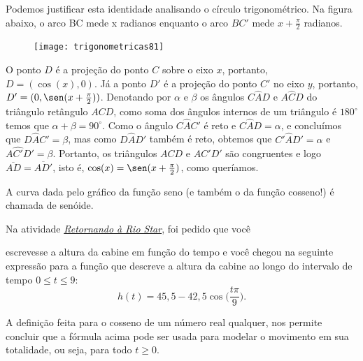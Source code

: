 Podemos justificar esta identidade analisando o círculo trigonométrico. Na figura abaixo, o arco BC mede x radianos enquanto o arco $BC'$ mede $x + \frac{\pi}{2}$ radianos. 

\begin{figure}[H]
\centering

\texttt{[image: trigonometricas81]}
\end{figure}

O ponto $D$ é a projeção do ponto $C$ sobre o eixo $x$, portanto, $D = (\cos(x), 0)$. Já a ponto $D'$ é a projeção do ponto $C'$ no eixo $y$, portanto, $D' = (0,\sen(x +  \frac{\pi}{2}))$. Denotando por $\alpha$ e $\beta$ os ângulos $C\hat{A}D$ e $A\hat{C}D$ do triângulo retângulo $ACD$, como soma dos ângulos internos de um triângulo é $180^{\circ}$ temos que $\alpha+\beta=90^{\circ}$. Como o ângulo $C\hat{A}C'$ é reto e $C\hat{A}D=\alpha$, e concluímos que $D\hat{A}C'=\beta$, mas como $D\hat{A}D'$ também é reto, obtemos que $C'\hat{A}D'=\alpha$ e $A\hat{C'}D'=\beta$. Portanto, os triângulos $ACD$ e $AC'D'$ são congruentes e logo $\overline{AD}=\overline{AD'}$, isto é, $\cos(x) = \sen(x +  \frac{\pi}{2})$, como queríamos.


A curva dada pelo gráfico da função seno (e também o da função cosseno!) é chamada de senóide. 


\begin{observation}{}
Na atividade \hyperref[trig-ativ15]{\textit{Retornando à Rio Star}}, foi pedido que você


escrevesse a altura da cabine em função do tempo e você chegou na seguinte expressão para a função que descreve a altura da cabine ao longo do intervalo de tempo $0\leq t\leq 9$:
\begin{equation*}
h(t)=45{,}5-42{,}5\cos\bigg(\frac{t\pi}{9}\bigg).
\end{equation*}

A definição feita para o cosseno de um número real qualquer, nos permite concluir que a fórmula acima pode ser usada para modelar o movimento em sua totalidade, ou seja, para todo $t\geq0$.

\end{observation}


\exercise


